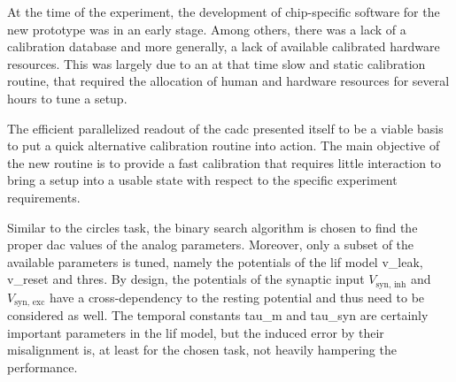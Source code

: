 At the time of the experiment, the development of chip-specific software for the new prototype was in an early stage. Among others, there was a lack of a calibration database and more generally, a lack of available calibrated hardware resources. This was largely due to an at that time slow and static calibration routine, that required the allocation of human and hardware resources for several hours to tune a setup.

The efficient parallelized readout of the \gls{cadc} presented itself to be a viable basis to put a quick alternative calibration routine into action. The main objective of the new routine is to provide a fast calibration that requires little interaction to bring a setup into a usable state with respect to the specific experiment requirements. 

Similar to the circles task, the binary search algorithm is chosen to find the proper \gls{dac} values of the analog parameters. Moreover, only a subset of the available parameters is tuned, namely the potentials of the \gls{lif} model \gls{v_leak}, \gls{v_reset} and \gls{thres}. By design, the potentials of the synaptic input $V_\text{syn, inh}$ and $V_\text{syn, exc}$ have a cross-dependency to the resting potential and thus need to be considered as well. The temporal constants \gls{tau_m} and \gls{tau_syn} are certainly important parameters in the \gls{lif} model, but the induced error by their misalignment is, at least for the chosen task, not heavily hampering the performance.

